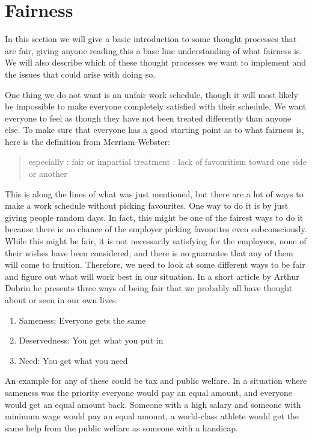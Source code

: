 \section{Fairness}
In this section we will give a basic introduction to some thought processes that are fair, giving anyone reading this a base line understanding of what fairness is. We will also describe which of these thought processes we want to implement and the issues that could arise with doing so.  

One thing we do not want is an unfair work schedule, though it will most likely be impossible to make everyone completely satisfied with their schedule. We want everyone to feel as though they have not been treated differently than anyone else. To make sure that everyone has a good starting point as to what fairness is, here is the definition from Merriam-Webster: 
\begin{quote}
    especially : fair or impartial treatment : lack of favouritism toward one side or another
    \parencite{merriam-webster_definition_nodate}
\end{quote}
This is along the lines of what was just mentioned, but there are a lot of ways to make a work schedule without picking favourites. One way to do it is by just giving people random days. In fact, this might be one of the fairest ways to do it because there is no chance of the employer picking favourites even subconsciously. While this might be fair, it is not necessarily satisfying for the employees, none of their wishes have been considered, and there is no guarantee that any of them will come to fruition. Therefore, we need to look at some different ways to be fair and figure out what will work best in our situation. In a short article by Arthur Dobrin \parencite{dobrin_its_2012} he presents three ways of being fair that we probably all have thought about or seen in our own lives. 
\begin{enumerate}
    \item Sameness: Everyone gets the same
    \item Deservedness: You get what you put in
    \item Need: You get what you need
\end{enumerate}
An example for any of these could be tax and public welfare. In a situation where sameness was the priority everyone would pay an equal amount, and everyone would get an equal amount back. Someone with a high salary and someone with minimum wage would pay an equal amount, a world-class athlete would get the same help from the public welfare as someone with a handicap.
